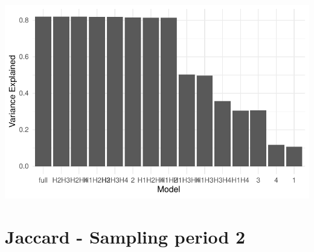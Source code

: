 \documentclass[
  letterpaper,
  DIV=11,
  numbers=noendperiod]{scrreprt}
\begin{document}
\includegraphics{05_VarPart_files/figure-pdf/var-part-ranger-performance-eval-J1-1.pdf}

\section{Jaccard - Sampling period 2}
\end{document}
